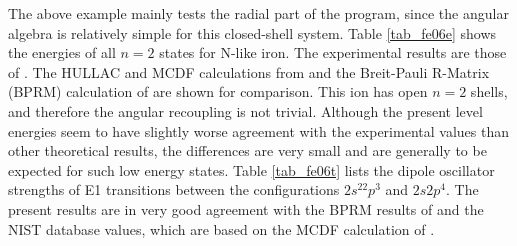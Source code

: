 \documentclass[preprint, floatfix, pra, showpacs, showkeys]{revtex4}
\begin{document}
The above example mainly tests the radial part of the program, since the
angular algebra is relatively simple for this closed-shell system. Table
\ref{tab_fe06e} shows the energies of all $n=2$ states for N-like
iron. The experimental results are those of \textcite{sugar85}. The
HULLAC and MCDF calculations from \textcite{savin02} and the Breit-Pauli
R-Matrix (BPRM) calculation of \textcite{zhang00} are shown for
comparison. This ion has open $n=2$ shells, and therefore the angular
recoupling is  
not trivial. Although the present level energies seem to have slightly worse
agreement with the experimental values than other
theoretical results, the differences are very small and are generally to be
expected for such low energy states. Table \ref{tab_fe06t} lists the dipole
oscillator strengths of E1 transitions between the configurations
$2s^22p^3$ and $2s2p^4$. The present results are in very good agreement with
the BPRM results of \textcite{zhang00} and 
the NIST database values\cite{fuhr88}, which are based on the MCDF calculation
of \textcite{cheng79}. 
\end{document}
